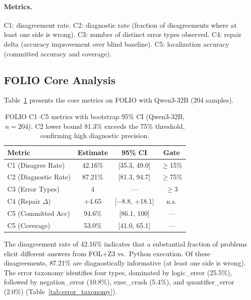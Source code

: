 \documentclass[11pt,a4paper]{article}
\newcommand{\pp}{\text{pp}}
\begin{document}
\paragraph{Metrics.} C1: disagreement rate. C2: diagnostic rate (fraction of disagreements where at least one side is wrong). C3: number of distinct error types observed. C4: repair delta (accuracy improvement over blind baseline). C5: localization accuracy (committed accuracy and coverage).

\subsection{FOLIO Core Analysis}
\label{sec:folio_core}

Table~\ref{tab:folio_core} presents the core metrics on FOLIO with Qwen3-32B (204 samples).

\begin{table}[t]
\centering
\small
\begin{tabular}{lccc}
\toprule
\textbf{Metric} & \textbf{Estimate} & \textbf{95\% CI} & \textbf{Gate} \\
\midrule
C1 (Disagree Rate) & 42.16\% & [35.3, 49.0] & $\geq$15\% \\
C2 (Diagnostic Rate) & 87.21\% & [81.3, 94.7] & $\geq$75\% \\
C3 (Error Types) & 4 & --- & $\geq$3 \\
C4 (Repair $\Delta$) & +4.65\pp{} & [$-$8.8, +18.1] & n.s. \\
C5 (Committed Acc) & 94.6\% & [86.1, 100] & --- \\
C5 (Coverage) & 53.0\% & [41.0, 65.1] & --- \\
\bottomrule
\end{tabular}
\caption{FOLIO C1--C5 metrics with bootstrap 95\% CI (Qwen3-32B, $n\!=\!204$). C2 lower bound 81.3\% exceeds the 75\% threshold, confirming high diagnostic precision.}
\label{tab:folio_core}
\end{table}

The disagreement rate of 42.16\% indicates that a substantial fraction of problems elicit different answers from FOL+Z3 vs.\ Python execution. Of these disagreements, 87.21\% are diagnostically informative (at least one side is wrong). The error taxonomy identifies four types, dominated by logic\_error (25.5\%), followed by negation\_error (10.8\%), exec\_crash (5.4\%), and quantifier\_error (2.0\%) (Table~\ref{tab:error_taxonomy}).
\end{document}
